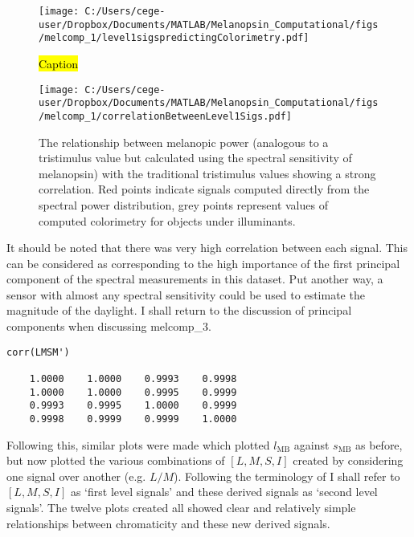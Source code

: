 \begin{figure}[h]
    \centering
    \texttt{[image: C:/Users/cege-user/Dropbox/Documents/MATLAB/Melanopsin\_Computational/figs/melcomp\_1/level1sigspredictingColorimetry.pdf]}
    \caption{\hl{Caption}}
    \label{fig:l1}
\end{figure} 

\begin{figure}[h]
    \centering
    \texttt{[image: C:/Users/cege-user/Dropbox/Documents/MATLAB/Melanopsin\_Computational/figs/melcomp\_1/correlationBetweenLevel1Sigs.pdf]}
    \caption{The relationship between melanopic power (analogous to a tristimulus value but calculated using the spectral sensitivity of melanopsin) with the traditional tristimulus values showing a strong correlation. Red points indicate signals computed directly from the spectral power distribution, grey points represent values of computed colorimetry for objects under illuminants.}
    \label{fig:tristimCorrelation}
\end{figure} 

It should be noted that there was very high correlation between each signal. This can be considered as corresponding to the high importance of the first principal component of the spectral measurements in this dataset. Put another way, a sensor with almost any spectral sensitivity could be used to estimate the magnitude of the daylight. I shall return to the discussion of principal components when discussing melcomp\_3.

\begin{minipage}{\linewidth}
\begin{lstlisting}
corr(LMSM')

    1.0000    1.0000    0.9993    0.9998
    1.0000    1.0000    0.9995    0.9999
    0.9993    0.9995    1.0000    0.9999
    0.9998    0.9999    0.9999    1.0000
\end{lstlisting}
\end{minipage}

Following this, similar plots were made which plotted $l_{\text{MB}}$ against $s_{\text{MB}}$ as before, but now plotted the various combinations of $[L,M,S,I]$ created by considering one signal over another (e.g. $L/M$). Following the terminology of \cite{barrionuevo_contributions_2014} I shall refer to $[L,M,S,I]$ as `first level signals' and these derived signals as `second level signals'. The twelve plots created all showed clear and relatively simple relationships between chromaticity and these new derived signals.

